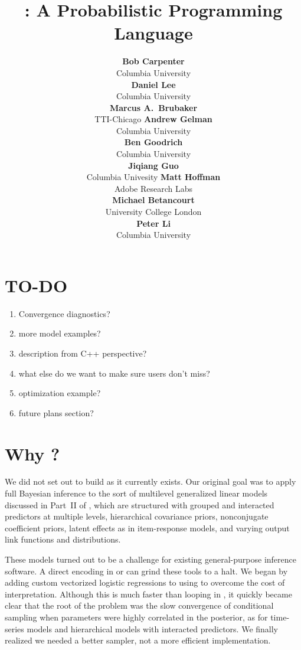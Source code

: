 \documentclass[article]{jss}
\author{{\bf\large Bob Carpenter}
        \\ Columbia University
        \\[9pt]
        {\bf\large Daniel Lee}
        \\ Columbia University
        \\[9pt]
        {\bf\large Marcus A.\ Brubaker}
        \\ TTI-Chicago
    \And
        {\bf\large Andrew Gelman}
        \\ Columbia University
        \\[9pt]
        {\bf\large Ben Goodrich}
        \\ Columbia University
        \\[9pt]
        {\bf\large Jiqiang Guo}
        \\ Columbia Univesity
     \And
        {\bf\large Matt Hoffman}
        \\ Adobe Research Labs
        \\[9pt]
        {\bf\large Michael Betancourt}
        \\ University College London
        \\[9pt]
        {\bf\large Peter Li}
        \\ Columbia University
}
\title{\proglang{Stan}: A Probabilistic Programming Language}
\begin{document}
\section{TO-DO}

\begin{enumerate}
\item Convergence diagnostics?
\item more model examples?
\item description from C++ perspective?
\item what else do we want to make sure users don't miss?
\item optimization example?
\item future plans section?
\end{enumerate}


\section[Why Stan?]{Why ?}

We did not set out to build  as it currently exists.
Our original goal was to apply full Bayesian inference to the sort of multilevel
generalized linear models discussed in Part~II of
\citep{GelmanHill:2007}, which are structured with grouped and
interacted predictors at multiple levels, hierarchical covariance
priors, nonconjugate coefficient priors, latent effects as in
item-response models, and varying output link functions and
distributions.

These models turned out to be a challenge for
existing general-purpose inference software.  A direct encoding in
 \citep{LunnEtAl:2000,LunnEtAl:2009,LunnEtAl:2012} or
 \citep{Plummer:2003} can grind these tools to a halt.
We began by adding custom vectorized logistic regressions to 
using  to overcome the cost of interpretation.  Although
this is much faster than looping in , it quickly became
clear that the root of the problem was the slow convergence of
conditional sampling when parameters were highly correlated 
in the posterior, as for time-series models and hierarchical models 
with interacted predictors.  We finally realized we needed a better sampler, 
not a more efficient implementation.
\end{document}
